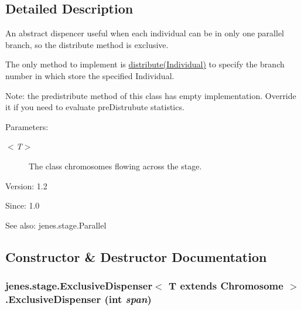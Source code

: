 \subsection{Detailed Description}
An abstract dispencer useful when each individual can be in only one parallel branch, so the distribute method is exclusive.\par
 The only method to implement is \hyperlink{}{distribute(Individual)} to specify the branch number in which store the specified Individual.\par
 \par
 Note: the predistribute method of this class has empty implementation. Override it if you need to evaluate preDistrubute statistics.

\begin{Desc}
\item[Parameters:]
\begin{description}
\item[{\em $<$T$>$}]The class chromosomes flowing across the stage.\end{description}
\end{Desc}
\begin{Desc}
\item[Version:]1.2 \end{Desc}
\begin{Desc}
\item[Since:]1.0\end{Desc}
\begin{Desc}
\item[See also:]jenes.stage.Parallel \end{Desc}


\subsection{Constructor \& Destructor Documentation}
\hypertarget{classjenes_1_1stage_1_1_exclusive_dispenser_3_01_t_01extends_01_chromosome_01_4_f8fba035b8567ce8d509fbc7601b4c75}{
\subsubsection[ExclusiveDispenser]{\setlength{\rightskip}{0pt plus 5cm}jenes.stage.ExclusiveDispenser$<$ T extends Chromosome $>$.ExclusiveDispenser (int {\em span})}}
\label{classjenes_1_1stage_1_1_exclusive_dispenser_3_01_t_01extends_01_chromosome_01_4_f8fba035b8567ce8d509fbc7601b4c75}


